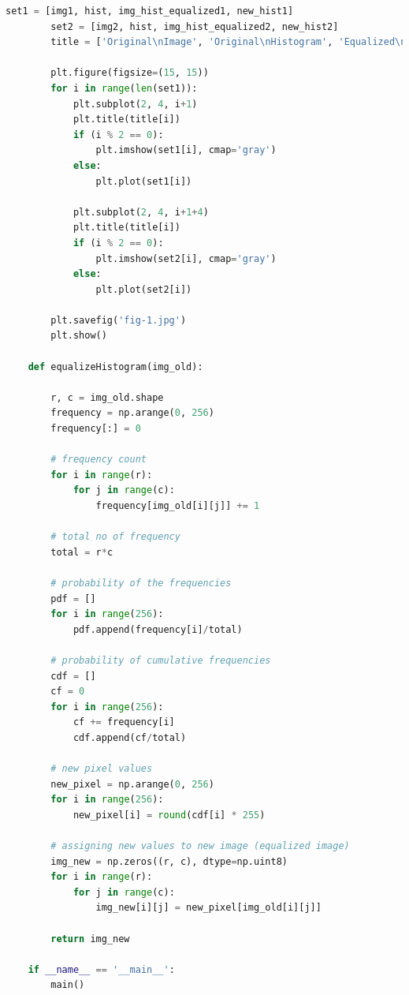 \documentclass{article}
\begin{document}
{\begin{lstlisting}[language=Python, caption=Code for histogram equalization]
        set1 = [img1, hist, img_hist_equalized1, new_hist1]
        set2 = [img2, hist, img_hist_equalized2, new_hist2]
        title = ['Original\nImage', 'Original\nHistogram', 'Equalized\nImage', 'Equalized\nHistogram']
    
        plt.figure(figsize=(15, 15))
        for i in range(len(set1)):
            plt.subplot(2, 4, i+1)
            plt.title(title[i])
            if (i % 2 == 0):
                plt.imshow(set1[i], cmap='gray')
            else: 
                plt.plot(set1[i])
    
            plt.subplot(2, 4, i+1+4)
            plt.title(title[i])
            if (i % 2 == 0):
                plt.imshow(set2[i], cmap='gray')
            else: 
                plt.plot(set2[i])
        
        plt.savefig('fig-1.jpg')
        plt.show()
    
    def equalizeHistogram(img_old):
        
        r, c = img_old.shape 
        frequency = np.arange(0, 256)
        frequency[:] = 0
    
        # frequency count
        for i in range(r):
            for j in range(c):
                frequency[img_old[i][j]] += 1
        
        # total no of frequency
        total = r*c
        
        # probability of the frequencies
        pdf = []
        for i in range(256):
            pdf.append(frequency[i]/total)
        
        # probability of cumulative frequencies
        cdf = []
        cf = 0
        for i in range(256):
            cf += frequency[i]
            cdf.append(cf/total)
        
        # new pixel values
        new_pixel = np.arange(0, 256)
        for i in range(256):
            new_pixel[i] = round(cdf[i] * 255)
    
        # assigning new values to new image (equalized image)
        img_new = np.zeros((r, c), dtype=np.uint8)
        for i in range(r):
            for j in range(c):
                img_new[i][j] = new_pixel[img_old[i][j]]
    
        return img_new
    
    if __name__ == '__main__':
        main()

    \end{lstlisting}
    \\
    
}
\end{document}
